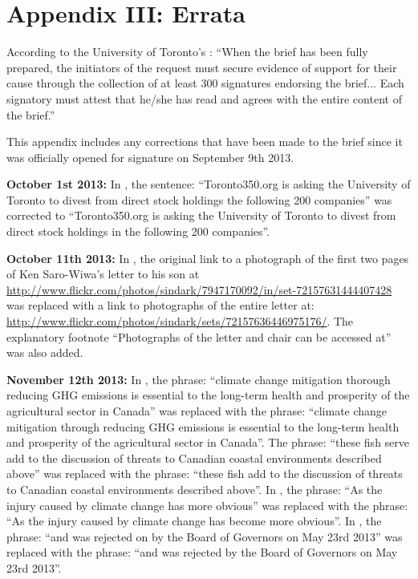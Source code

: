 \documentclass[10pt]{article}
\begin{document}






\clearpage



		\singlespacing
		\section{Appendix III: Errata}
		\label{sec:Errata}
		\doublespacing



According to the University of Toronto's : ``When the brief has been fully prepared, the initiators of the request must secure evidence of support for their cause through the collection of at least 300 signatures endorsing the brief... Each signatory must attest that he/she has read and agrees with the entire content of the brief.''



This appendix includes any corrections that have been made to the brief since it was officially opened for signature on September 9th 2013.



\textbf{October 1st 2013:} In , the sentence: ``Toronto350.org is asking the University of Toronto to divest from direct stock holdings the following 200 companies'' was corrected to ``Toronto350.org is asking the University of Toronto to divest from direct stock holdings in the following 200 companies''.



\textbf{October 11th 2013:} In , the original link to a photograph of the first two pages of Ken Saro-Wiwa's letter to his son at \url{http://www.flickr.com/photos/sindark/7947170092/in/set-72157631444407428} was replaced with a link to photographs of the entire letter at: \url{http://www.flickr.com/photos/sindark/sets/72157636446975176/}. The explanatory footnote ``Photographs of the letter and chair can be accessed at'' was also added.

\textbf{November 12th 2013:} In , the phrase: ``climate change mitigation thorough reducing GHG emissions is essential to the long-term health and prosperity of the agricultural sector in Canada'' was replaced with the phrase: ``climate change mitigation through reducing GHG emissions is essential to the long-term health and prosperity of the agricultural sector in Canada''. The phrase: ``these fish serve add to the discussion of threats to Canadian coastal environments described above'' was replaced with the phrase: ``these fish add to the discussion of threats to Canadian coastal environments described above''. In , the phrase: ``As the injury caused by climate change has more obvious'' was replaced with the phrase: ``As the injury caused by climate change has become more obvious''. In , the phrase: ``and was rejected on by the Board of Governors on May 23rd 2013'' was replaced with the phrase: ``and was rejected by the Board of Governors on May 23rd 2013''.
\end{document}
